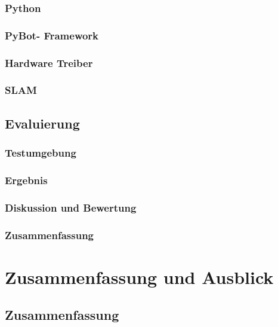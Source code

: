 \documentclass[a4paper,cleardoubleempty,BCOR1cm]{book}
\begin{document}
\subsection{Python}

\subsection{PyBot- Framework}

\subsection{Hardware Treiber}

\subsection{SLAM}



\section{Evaluierung}

\subsection{Testumgebung}

\subsection{Ergebnis}

\subsection{Diskussion und Bewertung}


\subsection{Zusammenfassung}




\chapter{Zusammenfassung und Ausblick}

\section{Zusammenfassung}
\end{document}
